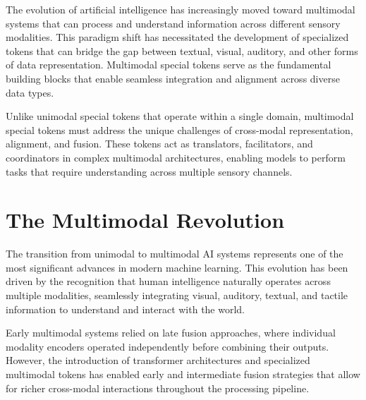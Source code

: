 
The evolution of artificial intelligence has increasingly moved toward multimodal systems that can process and understand information across different sensory modalities. This paradigm shift has necessitated the development of specialized tokens that can bridge the gap between textual, visual, auditory, and other forms of data representation. Multimodal special tokens serve as the fundamental building blocks that enable seamless integration and alignment across diverse data types.
\begin{comment}
Feedback: This is a strong opening. To make it even more engaging, you could use a metaphor to explain the role of these tokens. For example: "If unimodal tokens are the words of a single language, multimodal special tokens are the skilled interpreters and translators who facilitate a conversation between speakers of different languages—text, vision, and audio. They are the linchpin that allows a unified understanding to emerge from diverse data streams."
\end{comment}

Unlike unimodal special tokens that operate within a single domain, multimodal special tokens must address the unique challenges of cross-modal representation, alignment, and fusion. These tokens act as translators, facilitators, and coordinators in complex multimodal architectures, enabling models to perform tasks that require understanding across multiple sensory channels.

\section{The Multimodal Revolution}

The transition from unimodal to multimodal AI systems represents one of the most significant advances in modern machine learning. This evolution has been driven by the recognition that human intelligence naturally operates across multiple modalities, seamlessly integrating visual, auditory, textual, and tactile information to understand and interact with the world.

Early multimodal systems relied on late fusion approaches, where individual modality encoders operated independently before combining their outputs. However, the introduction of transformer architectures and specialized multimodal tokens has enabled early and intermediate fusion strategies that allow for richer cross-modal interactions throughout the processing pipeline.

